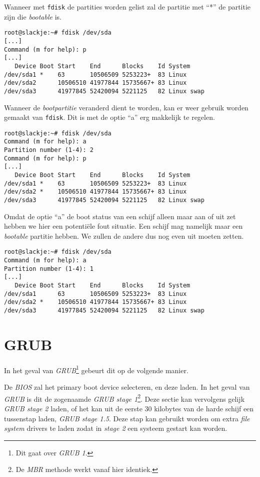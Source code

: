 Wanneer met \texttt{fdisk} de partities worden gelist zal de partitie met ``*'' de partitie zijn die \emph{bootable} is. 
\begin{lstlisting}
root@slackje:~# fdisk /dev/sda 
[...]
Command (m for help): p
[...]
   Device Boot Start    End      Blocks    Id System
/dev/sda1 *    63       10506509 5253223+  83 Linux
/dev/sda2      10506510 41977844 15735667+ 83 Linux
/dev/sda3      41977845 52420094 5221125   82 Linux swap
\end{lstlisting}
Wanneer de \emph{bootpartitie} veranderd dient te worden, kan er weer gebruik worden gemaakt van \texttt{fdisk}. Dit is met de optie ``a'' erg makkelijk te regelen. 
\begin{lstlisting}
root@slackje:~# fdisk /dev/sda 
Command (m for help): a
Partition number (1-4): 2
Command (m for help): p
[...]
   Device Boot Start    End      Blocks    Id System
/dev/sda1 *    63       10506509 5253223+  83 Linux
/dev/sda2 *    10506510 41977844 15735667+ 83 Linux
/dev/sda3      41977845 52420094 5221125   82 Linux swap
\end{lstlisting}
Omdat de optie ``a'' de boot status van een schijf alleen maar aan of uit zet hebben we hier een potenti\"{e}le fout situatie. Een schijf mag namelijk maar een \emph{bootable} partitie hebben. We zullen de andere dus nog even uit moeten zetten. 
\begin{lstlisting}
root@slackje:~# fdisk /dev/sda 
Command (m for help): a
Partition number (1-4): 1
[...]
   Device Boot Start    End      Blocks    Id System
/dev/sda1      63       10506509 5253223+  83 Linux
/dev/sda2 *    10506510 41977844 15735667+ 83 Linux
/dev/sda3      41977845 52420094 5221125   82 Linux swap
\end{lstlisting}

\section{GRUB}
In het geval van \emph{GRUB}\footnote{Dit gaat over \emph{GRUB 1}.} gebeurt dit op de volgende manier.

De \emph{BIOS} zal het primary boot device selecteren, en deze laden. In het geval van \emph{GRUB} is dit de zogenaamde \emph{GRUB stage 1}\footnote{De \emph{MBR} methode werkt vanaf hier identiek.}. Deze sectie kan vervolgens gelijk \emph{GRUB stage 2} laden, of het kan uit de eerste 30 kilobytes van de harde schijf een tussenstap laden, \emph{GRUB stage 1.5}. Deze stap kan gebruikt worden om extra \emph{file system} drivers te laden zodat in \emph{stage 2} een systeem gestart kan worden. 

